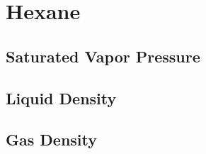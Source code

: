 \documentclass[../thesis.tex]{subfiles}
\begin{document}
    \section{Hexane}
    \label{sec:hexane}

        \subsection{Saturated Vapor Pressure}


        \subsection{Liquid Density}


        \subsection{Gas Density}
\end{document}
